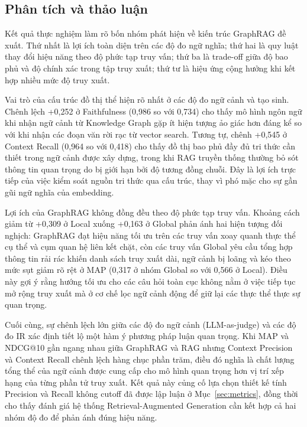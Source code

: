 \subsection{Phân tích và thảo luận}

Kết quả thực nghiệm làm rõ bốn nhóm phát hiện về kiến trúc GraphRAG đề xuất. Thứ nhất là lợi ích toàn diện trên các độ đo ngữ nghĩa; thứ hai là quy luật thay đổi hiệu năng theo độ phức tạp truy vấn; thứ ba là trade-off giữa độ bao phủ và độ chính xác trong tập truy xuất; thứ tư là hiệu ứng cộng hưởng khi kết hợp nhiều mức độ truy xuất.

Vai trò của cấu trúc đồ thị thể hiện rõ nhất ở các độ đo ngữ cảnh và tạo sinh. Chênh lệch +0,252 ở Faithfulness (0,986 so với 0,734) cho thấy mô hình ngôn ngữ khi nhận ngữ cảnh từ Knowledge Graph gặp ít hiện tượng ảo giác hơn đáng kể so với khi nhận các đoạn văn rời rạc từ vector search. Tương tự, chênh +0,545 ở Context Recall (0,964 so với 0,418) cho thấy đồ thị bao phủ đầy đủ tri thức cần thiết trong ngữ cảnh được xây dựng, trong khi RAG truyền thống thường bỏ sót thông tin quan trọng do bị giới hạn bởi độ tương đồng chuỗi. Đây là lợi ích trực tiếp của việc kiểm soát nguồn tri thức qua cấu trúc, thay vì phó mặc cho sự gần gũi ngữ nghĩa của embedding.

Lợi ích của GraphRAG không đồng đều theo độ phức tạp truy vấn. Khoảng cách giảm từ +0,309 ở Local xuống +0,163 ở Global phản ánh hai hiện tượng đối nghịch: GraphRAG đạt hiệu năng tối ưu trên các truy vấn xoay quanh thực thể cụ thể và cụm quan hệ liên kết chặt, còn các truy vấn Global yêu cầu tổng hợp thông tin rải rác khiến danh sách truy xuất dài, ngữ cảnh bị loãng và kéo theo mức sụt giảm rõ rệt ở MAP (0,317 ở nhóm Global so với 0,566 ở Local). Điều này gợi ý rằng hướng tối ưu cho các câu hỏi toàn cục không nằm ở việc tiếp tục mở rộng truy xuất mà ở cơ chế lọc ngữ cảnh động để giữ lại các thực thể thực sự quan trọng.

Cuối cùng, sự chênh lệch lớn giữa các độ đo ngữ cảnh (LLM-as-judge) và các độ đo IR xác định tiết lộ một hàm ý phương pháp luận quan trọng. Khi MAP và NDCG@10 gần ngang nhau giữa GraphRAG và RAG nhưng Context Precision và Context Recall chênh lệch hàng chục phần trăm, điều đó nghĩa là chất lượng tổng thể của ngữ cảnh được cung cấp cho mô hình quan trọng hơn vị trí xếp hạng của từng phần tử truy xuất. Kết quả này củng cố lựa chọn thiết kế tính Precision và Recall không cutoff đã được lập luận ở Mục~\ref{sec:metrics}, đồng thời cho thấy đánh giá hệ thống Retrieval-Augmented Generation cần kết hợp cả hai nhóm độ đo để phản ánh đúng hiệu năng.

